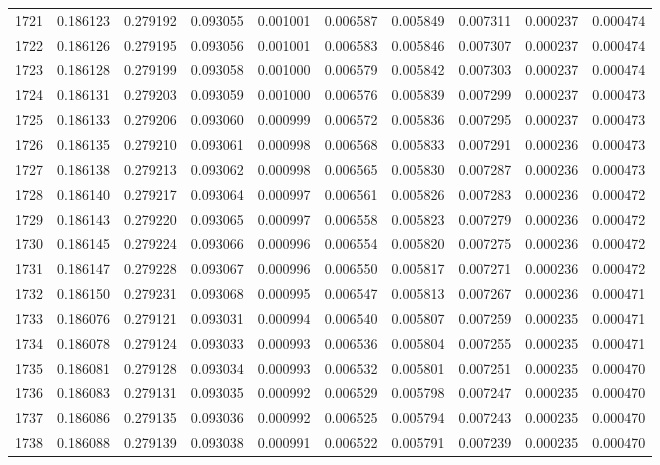 \begin{tabular}{lrrrrrrrrr}
1721 & 0.186123 & 0.279192 & 0.093055 & 0.001001 & 0.006587 & 0.005849 & 0.007311 & 0.000237 & 0.000474 \\
1722 & 0.186126 & 0.279195 & 0.093056 & 0.001001 & 0.006583 & 0.005846 & 0.007307 & 0.000237 & 0.000474 \\
1723 & 0.186128 & 0.279199 & 0.093058 & 0.001000 & 0.006579 & 0.005842 & 0.007303 & 0.000237 & 0.000474 \\
1724 & 0.186131 & 0.279203 & 0.093059 & 0.001000 & 0.006576 & 0.005839 & 0.007299 & 0.000237 & 0.000473 \\
1725 & 0.186133 & 0.279206 & 0.093060 & 0.000999 & 0.006572 & 0.005836 & 0.007295 & 0.000237 & 0.000473 \\
1726 & 0.186135 & 0.279210 & 0.093061 & 0.000998 & 0.006568 & 0.005833 & 0.007291 & 0.000236 & 0.000473 \\
1727 & 0.186138 & 0.279213 & 0.093062 & 0.000998 & 0.006565 & 0.005830 & 0.007287 & 0.000236 & 0.000473 \\
1728 & 0.186140 & 0.279217 & 0.093064 & 0.000997 & 0.006561 & 0.005826 & 0.007283 & 0.000236 & 0.000472 \\
1729 & 0.186143 & 0.279220 & 0.093065 & 0.000997 & 0.006558 & 0.005823 & 0.007279 & 0.000236 & 0.000472 \\
1730 & 0.186145 & 0.279224 & 0.093066 & 0.000996 & 0.006554 & 0.005820 & 0.007275 & 0.000236 & 0.000472 \\
1731 & 0.186147 & 0.279228 & 0.093067 & 0.000996 & 0.006550 & 0.005817 & 0.007271 & 0.000236 & 0.000472 \\
1732 & 0.186150 & 0.279231 & 0.093068 & 0.000995 & 0.006547 & 0.005813 & 0.007267 & 0.000236 & 0.000471 \\
1733 & 0.186076 & 0.279121 & 0.093031 & 0.000994 & 0.006540 & 0.005807 & 0.007259 & 0.000235 & 0.000471 \\
1734 & 0.186078 & 0.279124 & 0.093033 & 0.000993 & 0.006536 & 0.005804 & 0.007255 & 0.000235 & 0.000471 \\
1735 & 0.186081 & 0.279128 & 0.093034 & 0.000993 & 0.006532 & 0.005801 & 0.007251 & 0.000235 & 0.000470 \\
1736 & 0.186083 & 0.279131 & 0.093035 & 0.000992 & 0.006529 & 0.005798 & 0.007247 & 0.000235 & 0.000470 \\
1737 & 0.186086 & 0.279135 & 0.093036 & 0.000992 & 0.006525 & 0.005794 & 0.007243 & 0.000235 & 0.000470 \\
1738 & 0.186088 & 0.279139 & 0.093038 & 0.000991 & 0.006522 & 0.005791 & 0.007239 & 0.000235 & 0.000470 \\

\end{tabular}
